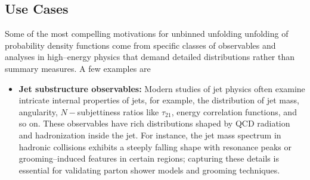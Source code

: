     \subsection{Use Cases}
    Some of the most compelling motivations for unbinned unfolding unfolding of probability density functions come from specific classes of observables and analyses in high--energy physics that demand detailed distributions rather than summary measures.
    A few examples are
    \begin{itemize}
        \item \textbf{Jet substructure observables:}
            Modern studies of jet physics often examine intricate internal properties of jets, for example, the distribution of jet mass, angularity, $N-$subjettiness ratios like $\tau_{21}$, energy correlation functions, and so on.
            These observables have rich distributions shaped by QCD radiation and hadronization inside the jet.
            For instance, the jet mass spectrum in hadronic collisions exhibits a steeply falling shape with resonance peaks or grooming--induced features in certain regions;
            capturing these details is essential for validating parton shower models and grooming techniques.
            

\end{itemize}
